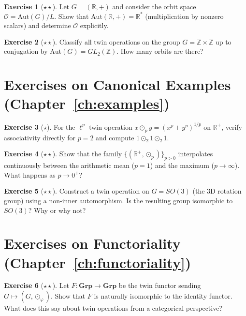 \documentclass[11pt,a4paper,openany]{book}
\theoremstyle{plain}
\theoremstyle{definition}
\newtheorem{exercise}{Exercise}[chapter]
\newcommand{\twing}[1]{\odot_{#1}}
\newcommand{\opspace}{\mathcal{O}}
\newcommand{\lingroup}{L}
\newcommand{\RR}{\mathbb{R}}
\newcommand{\ZZ}{\mathbb{Z}}
\newcommand{\Aut}{\mathrm{Aut}}
\begin{document}
\begin{exercise}[$\star\star$]
Let $G = (\RR, +)$ and consider the orbit space $\opspace = \Aut(G)/\lingroup$. Show that $\Aut(\RR, +) = \RR^*$ (multiplication by nonzero scalars) and determine $\opspace$ explicitly.
\end{exercise}

\begin{exercise}[$\star\star$]
Classify all twin operations on the group $G = \ZZ \times \ZZ$ up to conjugation by $\Aut(G) = GL_2(\ZZ)$. How many orbits are there?
\end{exercise}

\section*{Exercises on Canonical Examples (Chapter~\ref{ch:examples})}

\begin{exercise}[$\star$]
For the $\ell^p$-twin operation $x \twing{p} y = (x^p + y^p)^{1/p}$ on $\RR^+$, verify associativity directly for $p = 2$ and compute $1 \twing{2} 1 \twing{2} 1$.
\end{exercise}

\begin{exercise}[$\star\star$]
Show that the family $\{(\RR^+, \twing{p})\}_{p > 0}$ interpolates continuously between the arithmetic mean ($p = 1$) and the maximum ($p \to \infty$). What happens as $p \to 0^+$?
\end{exercise}

\begin{exercise}[$\star\star$]
Construct a twin operation on $G = SO(3)$ (the 3D rotation group) using a non-inner automorphism. Is the resulting group isomorphic to $SO(3)$? Why or why not?
\end{exercise}

\section*{Exercises on Functoriality (Chapter~\ref{ch:functoriality})}

\begin{exercise}[$\star\star$]
Let $F : \mathbf{Grp} \to \mathbf{Grp}$ be the twin functor sending $G \mapsto (G, \twing{\varphi})$. Show that $F$ is naturally isomorphic to the identity functor. What does this say about twin operations from a categorical perspective?
\end{exercise}
\end{document}
